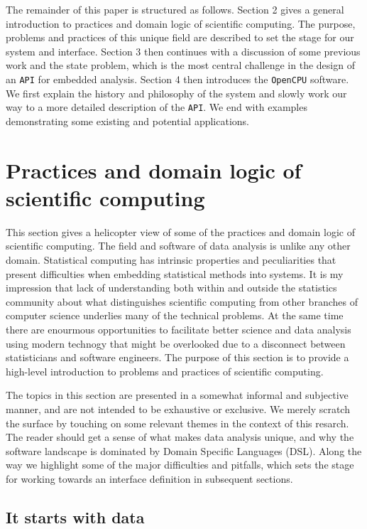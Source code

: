 \documentclass{article}
\newcommand{\API}{\texttt{API}\xspace}
\newcommand{\OpenCPU}{\texttt{OpenCPU}\xspace}
\begin{document}
The remainder of this paper is structured as follows. Section 2 gives a general introduction to practices and domain logic of scientific computing. The purpose, problems and practices of this unique field are described to set the stage for our system and interface. Section 3 then continues with a discussion of some previous work and the state problem, which is the most central challenge in the design of an \API for embedded analysis. Section 4 then introduces the \OpenCPU software. We first explain the history and philosophy of the system and slowly work our way to a more detailed description of the \API. We end with  examples demonstrating some existing and potential applications.


\section{Practices and domain logic of scientific computing}

This section gives a helicopter view of some of the practices and domain logic of scientific computing. The field and software of data analysis is unlike any other domain. Statistical computing has intrinsic properties and peculiarities that present difficulties when embedding statistical methods into systems. It is my impression that lack of understanding both within and outside the statistics community about what distinguishes scientific computing from other branches of computer science underlies many of the technical problems. At the same time there are enourmous opportunities to facilitate better science and data analysis using modern technogy that might be overlooked due to a disconnect between statisticians and software engineers. The purpose of this section is to provide a high-level introduction to problems and practices of scientific computing.

The topics in this section are presented in a somewhat informal and subjective manner, and are not intended to be exhaustive or exclusive. We merely scratch the surface by touching on some relevant themes in the context of this resarch. The reader should get a sense of what makes data analysis unique, and why the software landscape is dominated by Domain Specific Languages (DSL). Along the way we highlight some of the major difficulties and pitfalls, which sets the stage for working towards an interface definition in subsequent sections.

\subsection{It starts with data}
\end{document}
